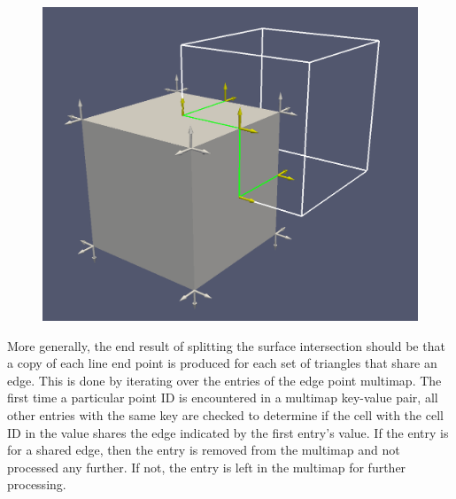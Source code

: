 \documentclass{InsightArticle}
\begin{document}
\begin{figure}
\centering
\includegraphics[scale=0.25]{Figures/BoxNormals}
\label{fig:BoxNormals}
\end{figure}

More generally, the end result of splitting the surface intersection should be that a copy of each line end point is produced for each set of triangles that share an edge. This is done by iterating over the entries of the edge point multimap. The first time a particular point ID is encountered in a multimap key-value pair, all other entries with the same key are checked to determine if the cell with the cell ID in the value shares the edge indicated by the first entry's value. If the entry is for a shared edge, then the entry is removed from the multimap and not processed any further. If not, the entry is left in the multimap for further processing.
\end{document}
